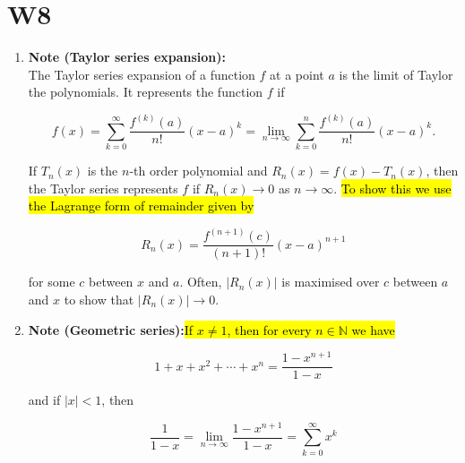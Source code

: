 \documentclass[10pt]{article}
\begin{document}
\newpage



\section{W8}
\begin{enumerate}

\item \textbf{Note (Taylor series expansion):}\\
The Taylor series expansion of a function $f$ at a point $a$ is the limit of Taylor the polynomials. It represents the function $f$ if

$$
f(x)=\sum_{k=0}^{\infty} \frac{f^{(k)}(a)}{n !}(x-a)^{k}=\lim _{n \rightarrow \infty} \sum_{k=0}^{n} \frac{f^{(k)}(a)}{n !}(x-a)^{k} .
$$

If $T_{n}(x)$ is the $n$-th order polynomial and $R_{n}(x)=f(x)-T_{n}(x)$, then the Taylor series represents $f$ if $R_{n}(x) \rightarrow 0$ as $n \rightarrow \infty$. \hl{To show this we use the Lagrange form of remainder given by}

$$
R_{n}(x)=\frac{f^{(n+1)}(c)}{(n+1) !}(x-a)^{n+1}
$$

for some $c$ between $x$ and $a$. Often, $\left|R_{n}(x)\right|$ is maximised over $c$ between $a$ and $x$ to show that $\left|R_{n}(x)\right| \rightarrow 0$.

\item \textbf{Note (Geometric series):}\hl{If $x \neq 1$, then for every $n \in \mathbb{N}$ we have}

$$
1+x+x^{2}+\cdots+x^{n}=\frac{1-x^{n+1}}{1-x}
$$

and if $|x|<1$, then

$$
\frac{1}{1-x}=\lim _{n \rightarrow \infty} \frac{1-x^{n+1}}{1-x}=\sum_{k=0}^{\infty} x^{k}
$$

\end{enumerate}


\newpage
\end{document}

